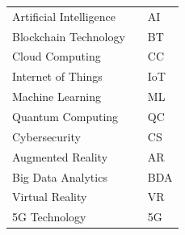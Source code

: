 \begin{center}
\begin{tabularx}{0.6\textwidth}{@{}lXl@{}}
    Artificial Intelligence &   & AI \\
    Blockchain Technology &   & BT \\
    Cloud Computing &   & CC \\
    Internet of Things &   & IoT \\
    Machine Learning &   & ML \\
    Quantum Computing &   & QC \\
    Cybersecurity &   & CS \\
    Augmented Reality &   & AR \\
    Big Data Analytics &   & BDA \\
    Virtual Reality &   & VR \\
    5G Technology &   & 5G \\
\end{tabularx}
\end{center}


